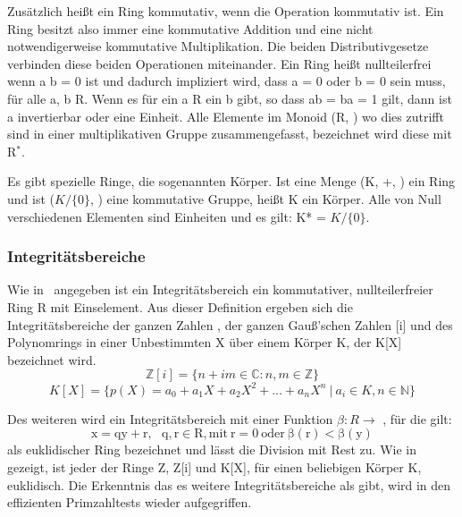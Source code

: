 			Zusätzlich heißt ein Ring kommutativ, wenn die Operation \mycdot kommutativ ist. Ein Ring besitzt also immer eine kommutative Addition und eine nicht notwendigerweise kommutative Multiplikation. Die beiden Distributivgesetze verbinden diese beiden Operationen miteinander. Ein Ring heißt nullteilerfrei wenn a \mycdot b = 0 ist und dadurch impliziert wird, dass a = 0 oder b = 0 sein muss, für alle a, b \myin R. Wenn es für ein a \myin R ein b gibt, so dass ab = ba = 1 gilt, dann ist a invertierbar oder eine Einheit. Alle Elemente im Monoid (R, \mycdotOhne) wo dies zutrifft sind in einer multiplikativen Gruppe zusammengefasst, bezeichnet wird diese mit R$^*$.~\cite{Erste:Hilfe:in:Linearer:Algebra}
			
			Es gibt spezielle Ringe, die sogenannten Körper. Ist eine Menge (K, +, \mycdotOhne) ein Ring und ist ($K / \{0\}$, \mycdotOhne) eine kommutative Gruppe, heißt K ein Körper. Alle von Null verschiedenen Elementen sind Einheiten und es gilt: K* = $K / \{0\}$.~\cite{Erste:Hilfe:in:Linearer:Algebra}
			
		\subsubsection{Integritätsbereiche}
			Wie in~\cite{Algorithmische:Zahlentheorie} angegeben ist ein Integritätsbereich ein kommutativer, nullteilerfreier Ring R mit Einselement. Aus dieser Definition ergeben sich die Integritätsbereiche der ganzen Zahlen , der ganzen Gauß’schen Zahlen [i] und des Polynomrings in einer Unbestimmten X über einem Körper K, der K[X] bezeichnet wird. 
			\begin{displaymath}
				\mathbb{Z}[i] = \{n + im  \in \mathbb{C} : n,m \in \mathbb{Z}\}
			\end{displaymath}
			\begin{displaymath}	
				K[X] = \{p(X)= a_0 + a_1X + a_2X^2 + . . . + a_nX^n~|~a_i \in K, n \in \mathbb{N}\}					
			\end{displaymath}

			Des weiteren wird ein Integritätsbereich mit einer Funktion  $\beta : R \longrightarrow$ , für die gilt: 
			\begin{displaymath}
				\mathrm{x = qy + r,~~~q, r \in R,	mit~r=0~oder~\beta(r) < \beta(y)}
			\end{displaymath}
			als euklidischer Ring bezeichnet und lässt die Division mit Rest zu. Wie in \cite{Algorithmische:Zahlentheorie} gezeigt, ist jeder der Ringe Z, Z[i] und K[X], für einen beliebigen Körper K, euklidisch. Die Erkenntnis das es weitere Integritätsbereiche als  gibt, wird in den effizienten Primzahltests wieder aufgegriffen. 
			
